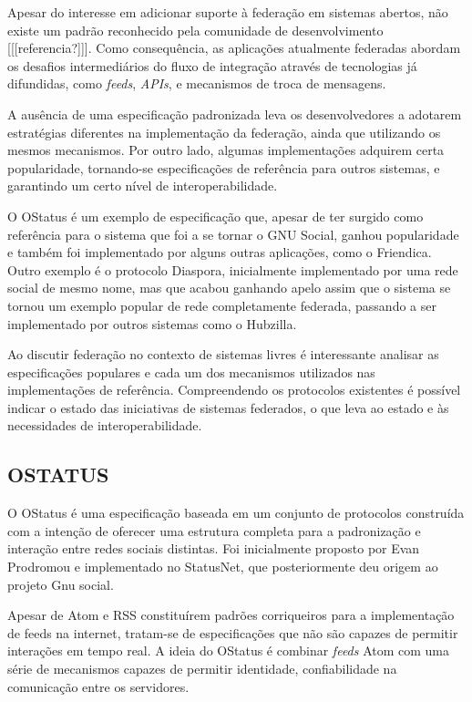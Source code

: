 Apesar do interesse em adicionar suporte à federação em sistemas abertos, não existe
um padrão reconhecido pela comunidade de desenvolvimento [[[referencia?]]]. Como
consequência, as aplicações atualmente federadas abordam os desafios intermediários
do fluxo de integração através de tecnologias já difundidas, como \textit{feeds},
\textit{APIs}, e mecanismos de troca de mensagens.

A ausência de uma especificação padronizada leva os desenvolvedores a adotarem
estratégias diferentes na implementação da federação, ainda que utilizando os mesmos
mecanismos. Por outro lado, algumas implementações adquirem certa popularidade,
tornando-se especificações de referência para outros sistemas, e garantindo um certo
nível de interoperabilidade.

O OStatus é um exemplo de especificação que, apesar de ter surgido como referência
para o sistema que foi a se tornar o GNU Social, ganhou popularidade e também foi
implementado por alguns outras aplicações, como o Friendica. Outro exemplo é o
protocolo Diaspora, inicialmente implementado por uma rede social de mesmo nome, mas
que acabou ganhando apelo assim que o sistema se tornou um exemplo popular de rede
completamente federada, passando a ser implementado por outros sistemas como o
Hubzilla.

Ao discutir federação no contexto de sistemas livres é interessante analisar as
especificações populares e cada um dos mecanismos utilizados nas implementações de
referência. Compreendendo os protocolos existentes é possível indicar o estado das
iniciativas de sistemas federados, o que leva ao estado e às necessidades de
interoperabilidade.

\subsection{OSTATUS}

O OStatus é uma especificação baseada em um conjunto de protocolos construída com a
intenção de oferecer uma estrutura completa para a padronização e interação entre
redes sociais distintas. Foi inicialmente proposto por Evan Prodromou e implementado
no StatusNet, que posteriormente deu origem ao projeto Gnu social.

Apesar de Atom e RSS constituírem padrões corriqueiros para a implementação de feeds
na internet, tratam-se de especificações que não são capazes de permitir interações
em tempo real. A ideia do OStatus é combinar \textit{feeds} Atom com uma série de
mecanismos capazes de permitir identidade, confiabilidade na comunicação entre os
servidores.

